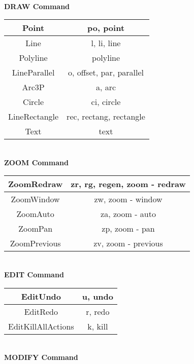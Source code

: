 \textbf{\\DRAW Command}
\begin{table}[h!]\centering\begin{tabular}{|c|c|}
\hline Point & po, point\\
\hline Line & l, li, line\\
\hline Polyline & polyline\\
\hline LineParallel & o, offset, par, parallel\\
\hline Arc3P & a, arc\\
\hline Circle & ci, circle\\
\hline LineRectangle & rec, rectang, rectangle\\
\hline Text & text\\
\hline \end{tabular}\end{table} \vspace{.1in}
%
\textbf{\\ZOOM Command}
\begin{table}[h!]\centering\begin{tabular}{|c|c|}
\hline ZoomRedraw & zr, rg, regen, zoom - redraw\\
\hline ZoomWindow & zw, zoom - window\\
\hline ZoomAuto & za, zoom - auto\\
\hline ZoomPan & zp, zoom - pan\\
\hline ZoomPrevious & zv, zoom - previous\\
\hline \end{tabular}\end{table} \vspace{.1in}
%
\textbf{\\EDIT Command}
\begin{table}[h!]\centering\begin{tabular}{|c|c|}
\hline EditUndo & u, undo\\
\hline EditRedo & r, redo\\
\hline EditKillAllActions & k, kill\\
\hline \end{tabular}\end{table}\vspace{.1in}
%
\textbf{\\MODIFY Command}
